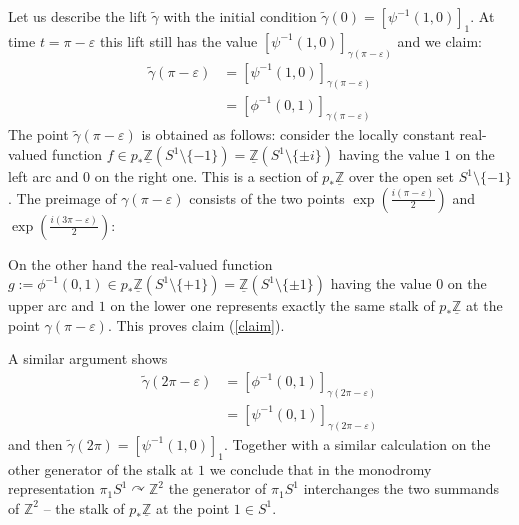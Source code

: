 \documentclass[10pt]{amsart}
\theoremstyle{definition}
\theoremstyle{plain}
\theoremstyle{remark}
\newcommand{\ZZ}{\mathbb{Z}}
\begin{document}

\vspace{1cm}

Let us describe the lift $\tilde{\gamma}$ with the initial condition $\tilde{\gamma}(0)=[\psi^{-1}(1,0)]_1$. At time $t=\pi-\varepsilon$ this lift still has the value $[\psi^{-1}(1,0)]_{\gamma(\pi-\varepsilon)}$ and we claim:
\begin{align}
\tilde{\gamma}(\pi-\varepsilon)&=[\psi^{-1}(1,0)]_{\gamma(\pi-\varepsilon)}\\
&=[\phi^{-1}(0,1)]_{\gamma(\pi-\varepsilon)}\label{claim}
\end{align}
The point $\tilde{\gamma}(\pi-\varepsilon)$ is obtained as follows: consider the locally constant real-valued function $f\in p_*\underline{\ZZ}(S^1\setminus\{-1\})=\underline{\ZZ}(S^1\setminus\{\pm i\})$ having the value $1$ on the left arc and $0$ on the right one. This is a section of $p_*\underline{\ZZ}$ over the open set $S^1\setminus\{-1\}$. The preimage of $\gamma(\pi-\varepsilon)$ consists of the two points $\exp\left(\frac{i(\pi-\varepsilon)}{2}\right)$ and $\exp\left(\frac{i(3\pi-\varepsilon)}{2}\right)$:\vspace{1cm}
\newline
On the other hand the real-valued function $g:=\phi^{-1}(0,1)\in p_*\underline{\ZZ}(S^1\setminus\{+1\})=\underline{\ZZ}(S^1\setminus\{\pm 1\})$ having the value $0$ on the upper arc and $1$ on the lower one represents exactly the same stalk of $p_*\underline{\ZZ}$ at the point $\gamma(\pi-\varepsilon)$. This proves claim (\ref{claim}).

A similar argument shows
\begin{align*}
\tilde{\gamma}(2\pi-\varepsilon)&=[\phi^{-1}(0,1)]_{\gamma(2\pi-\varepsilon)}\\
&=[\psi^{-1}(0,1)]_{\gamma(2\pi-\varepsilon)}
\end{align*}
and then $\tilde{\gamma}(2\pi)=[\psi^{-1}(1,0)]_1$. Together with a similar calculation on the other generator of the stalk at $1$ we conclude that in the monodromy representation $\pi_1S^1\curvearrowright\ZZ^2$ the generator of $\pi_1S^1$ interchanges the two summands of $\ZZ^2$ -- the stalk of $p_*\underline{\ZZ}$ at the point $1\in S^1$.
\end{document}
